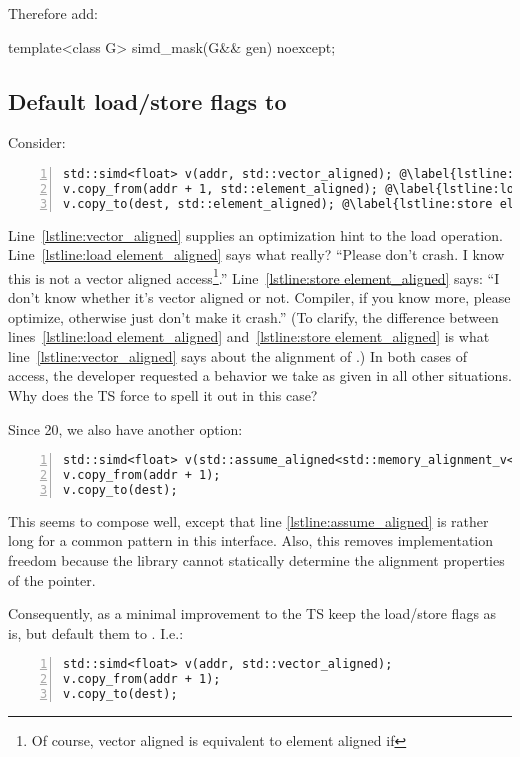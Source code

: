 Therefore add:
\begin{wgText}
\begin{itemdecl}
template<class G> simd_mask(G&& gen) noexcept;
\end{itemdecl}
\end{wgText}

\subsection{Default load/store flags to }

Consider:
\medskip\begin{lstlisting}[style=Vc,numbers=left]
std::simd<float> v(addr, std::vector_aligned); @\label{lstline:vector_aligned}@
v.copy_from(addr + 1, std::element_aligned); @\label{lstline:load element_aligned}@
v.copy_to(dest, std::element_aligned); @\label{lstline:store element_aligned}@
\end{lstlisting}
Line~\ref{lstline:vector_aligned} supplies an optimization hint to the load operation.
Line~\ref{lstline:load element_aligned} says what really?
“Please don't crash.
I know this is not a vector aligned access\footnote{Of course, vector aligned is equivalent to element aligned if }.”
Line~\ref{lstline:store element_aligned} says:
“I don't know whether it's vector aligned or not.
Compiler, if you know more, please optimize, otherwise just don't make it crash.”
(To clarify, the difference between lines~\ref{lstline:load element_aligned} and~\ref{lstline:store element_aligned} is what line~\ref{lstline:vector_aligned} says about the alignment of .)
In both cases of  access, the developer requested a behavior we take as given in all other situations.
Why does the TS force to spell it out in this case?

Since \CC{}20, we also have another option:
\medskip\begin{lstlisting}[numbers=left]
std::simd<float> v(std::assume_aligned<std::memory_alignment_v<std::simd<float>>>(addr)); @\label{lstline:assume_aligned}@
v.copy_from(addr + 1);
v.copy_to(dest);
\end{lstlisting}
This seems to compose well, except that line \ref{lstline:assume_aligned} is rather long for a common pattern in this interface.
Also, this removes implementation freedom because the library cannot statically determine the alignment properties of the pointer.

Consequently, as a minimal improvement to the TS keep the load/store flags as
is, but default them to .
I.e.:
\medskip\begin{lstlisting}[numbers=left]
std::simd<float> v(addr, std::vector_aligned);
v.copy_from(addr + 1);
v.copy_to(dest);
\end{lstlisting}

